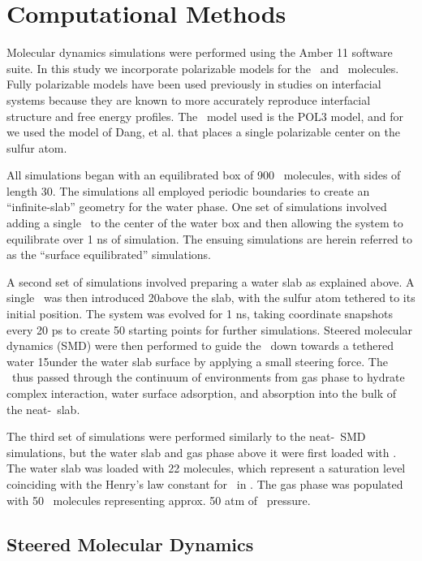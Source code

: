 \section{Computational Methods}

Molecular dynamics simulations were performed using the Amber 11 software suite.\cite{Case2010} In this study we incorporate polarizable models for the \wat~and \suldiox~molecules. Fully polarizable models have been used previously in studies on interfacial systems because they are known to more accurately reproduce interfacial structure and free energy profiles.\cite{Wick2007,Rivera2006,Dang1998} The \wat~model used is the POL3 model,\cite{Caldwell1995} and for \suldiox we used the model of Dang, et al. that places a single polarizable center on the sulfur atom.\cite{Baer2010}

All simulations began with an equilibrated box of 900 \wat~molecules, with sides of length 30\angs. The simulations all employed periodic boundaries to create an ``infinite-slab'' geometry for the water phase. One set of simulations involved adding a single \suldiox~to the center of the water box and then allowing the system to equilibrate over 1 ns of simulation. The ensuing simulations are herein referred to as the ``surface equilibrated'' simulations. 

A second set of simulations involved preparing a water slab as explained above. A single \suldiox~was then introduced 20\angs above the slab, with the sulfur atom tethered to its initial position. The system was evolved for 1 ns, taking coordinate snapshots every 20 ps to create 50 starting points for further simulations. Steered molecular dynamics (SMD) were then performed to guide the \suldiox~down towards a tethered water 15\angs under the water slab surface by applying a small steering force.\cite{Isralewitz2001} The \suldiox~thus passed through the continuum of environments from gas phase to hydrate complex interaction, water surface adsorption, and absorption into the bulk of the neat-\wat~slab.

The third set of simulations were performed similarly to the neat-\wat~SMD simulations, but the water slab and gas phase above it were first loaded with \suldiox. The water slab was loaded with 22 \suldiox molecules, which represent a saturation level coinciding with the Henry's law constant for \suldiox~in \wat. The gas phase was populated with 50 \suldiox~molecules representing approx. 50 atm of \suldiox~pressure.

\subsection{Steered Molecular Dynamics}

